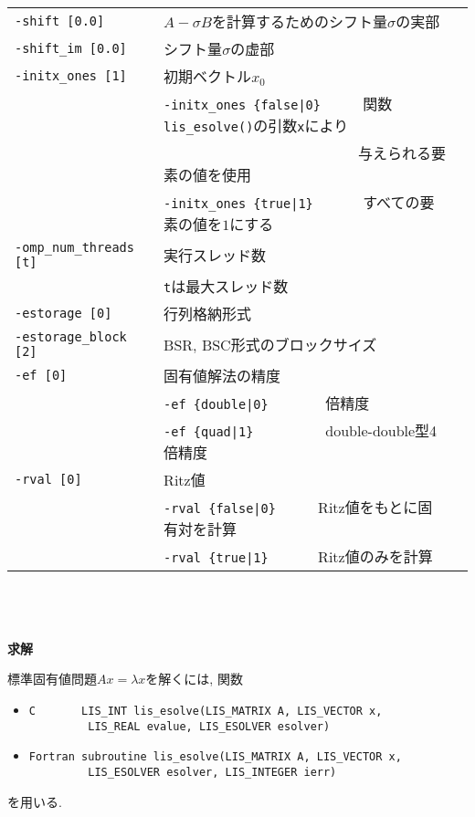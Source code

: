 \documentclass[a4paper]{jarticle}
\begin{document}
{{\begin{minipage}[t]{\textwidth}
\begin{center}
\begin{tabular}{l|ll}
\verb=-shift [0.0]= & $A-\sigma B$を計算するためのシフト量$\sigma$の実部 \\
\verb=-shift_im [0.0]= & シフト量$\sigma$の虚部 \\
\verb=-initx_ones [1]= & 初期ベクトル$x_{0}$  \\
                       & \verb=-initx_ones {false|0}     =  関数\verb=lis_esolve()=の引数\verb=x=により \\
                       & \verb=                          =  与えられる要素の値を使用 \\
                       & \verb=-initx_ones {true|1}      =  すべての要素の値を$1$にする\\
\verb=-omp_num_threads [t]= & 実行スレッド数         \\ 
                            & \verb=t=は最大スレッド数 \\
\verb=-estorage [0]=   & 行列格納形式 \\
\verb=-estorage_block [2]= & BSR, BSC形式のブロックサイズ \\ 
\verb=-ef [0]=         & 固有値解法の精度 \\
                       & \verb=-ef {double|0}       =   倍精度 \\
                       & \verb=-ef {quad|1}         =   double-double型4倍精度 \\
\verb=-rval [0]=       & Ritz値 \\
                       & \verb=-rval {false|0}     =  Ritz値をもとに固有対を計算 \\
                       & \verb=-rval {true|1}      =  Ritz値のみを計算 \\
\hline         
\end{tabular}
\end{center}
\end{minipage}
\\ \\ \\
\noindent
{\bf 求解}

標準固有値問題$Ax=\lambda x$を解くには, 関数
\begin{itemize}
\item \verb|C       LIS_INT lis_esolve(LIS_MATRIX A, LIS_VECTOR x,|\\
      \verb|         LIS_REAL evalue, LIS_ESOLVER esolver)|
\item \verb|Fortran subroutine lis_esolve(LIS_MATRIX A, LIS_VECTOR x,|\\
      \verb|         LIS_ESOLVER esolver, LIS_INTEGER ierr)|
\end{itemize}
を用いる. 

}}
\end{document}
